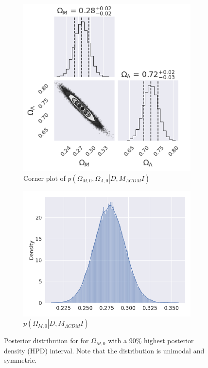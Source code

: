 \documentclass[11pt,a4paper]{article}
\begin{document}
\begin{figure}[H]
    \centering
    \begin{subfigure}{.5\textwidth}
          \centering
          \includegraphics[width=0.9\linewidth]{figures/corner_task2.png}
          \caption{Corner plot of $p\left(\Omega_{M,0},\Omega_{\Lambda,0} \left. \right\vert D, M_{\Lambda CDM} I \right)$}
          \label{fig:sub1}
    \end{subfigure}%
    \begin{subfigure}{.5\textwidth}
          \centering
          \includegraphics[width=0.9\linewidth]{figures/posterior_task2.png}
          \caption{$p\left(\Omega_{M,0} \left. \right\vert D, M_{\Lambda CDM} I\right)$}
          \label{fig:sub2}
    \end{subfigure}
    \caption{Posterior distribution for for $\Omega_{M,0}$ with a 90\% highest posterior density (HPD) interval. Note that the distribution is unimodal and symmetric.}
    \label{fig:posterior_task2}
\end{figure}

\printbibliography
\end{document}
